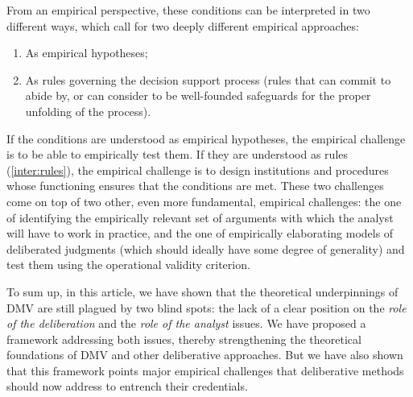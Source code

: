 \documentclass[version=3.21, pagesize, twoside=off, bibliography=totoc, DIV=calc, fontsize=12pt, a4paper, french, english]{scrartcl}
\begin{document}

From an empirical perspective, these conditions can be interpreted in two different ways, which call for two deeply different empirical approaches:
\begin{enumerate}[label=\emph{\roman*}, ref=\emph{\roman*}]
		\item \label{inter:empir} As empirical hypotheses;
	\item \label{inter:rules} As rules governing the decision support process (rules that \thedm{} can commit to abide by, or can consider to be well-founded safeguards for the proper unfolding of the process).
\end{enumerate}

If the conditions are understood as empirical hypotheses, the empirical challenge is to be able to empirically test them. If they are understood as rules (\ref{inter:rules}), the empirical challenge is to design institutions and procedures whose functioning ensures that the conditions are met. These two challenges come on top of two other, even more fundamental, empirical challenges: the one of identifying the empirically relevant set of arguments with which the analyst will have to work in practice, and the one of empirically elaborating models of deliberated judgments (which should ideally have some degree of generality)  and test them using the operational validity criterion.

To sum up, in this article, we have shown that the theoretical underpinnings of \ac{DMV} are still plagued by two blind spots: the lack of a clear position on the \emph{role of the deliberation} and the \emph{role of the analyst} issues. We have proposed a framework addressing both issues, thereby strengthening the theoretical foundations of \ac{DMV} and other deliberative approaches.  But we have also shown that this framework points major empirical challenges that deliberative methods should now address to entrench their credentials.
 
\end{document}
